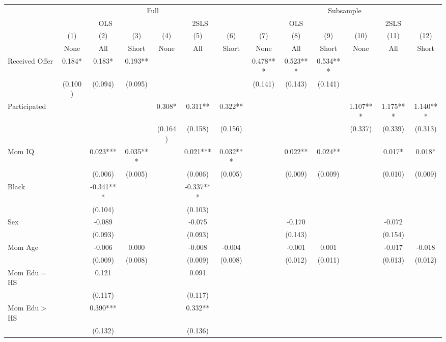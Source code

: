 \begin{tabular}{lcccccccccccc}
\toprule 
\midrule 
 & \multicolumn{6}{c}{Full} & \multicolumn{6}{c}{Subsample} \\
 \cmidrule(lr){2-7} \cmidrule(lr){8-13} 
 & \multicolumn{3}{c}{OLS} & \multicolumn{3}{c}{2SLS} & \multicolumn{3}{c}{OLS} & \multicolumn{3}{c}{2SLS} \\
 \cmidrule(lr){2-4} \cmidrule(lr){5-7} \cmidrule(lr){8-10} \cmidrule(lr){11-13} 
 & (1) & (2) & (3) & (4) & (5) & (6) & (7) & (8) & (9) & (10) & (11) & (12) \\
 & None & All & Short & None & All & Short & None & All & Short & None & All & Short \\
\midrule 
Received Offer & 0.184* & 0.183* & 0.193** &  &  &  & 0.478*** & 0.523*** & 0.534*** &  &  &  \\
 & (0.100) & (0.094) & (0.095) &  &  &  & (0.141) & (0.143) & (0.141) &  &  &  \\
Participated &  &  &  & 0.308* & 0.311** & 0.322** &  &  &  & 1.107*** & 1.175*** & 1.140*** \\
 &  &  &  & (0.164) & (0.158) & (0.156) &  &  &  & (0.337) & (0.339) & (0.313) \\
Mom IQ &  & 0.023*** & 0.035*** &  & 0.021*** & 0.032*** &  & 0.022** & 0.024** &  & 0.017* & 0.018* \\
 &  & (0.006) & (0.005) &  & (0.006) & (0.005) &  & (0.009) & (0.009) &  & (0.010) & (0.009) \\
Black &  & -0.341*** &  &  & -0.337*** &  &  &  &  &  &  &  \\
 &  & (0.104) &  &  & (0.103) &  &  &  &  &  &  &  \\
Sex &  & -0.089 &  &  & -0.075 &  &  & -0.170 &  &  & -0.072 &  \\
 &  & (0.093) &  &  & (0.093) &  &  & (0.143) &  &  & (0.154) &  \\
Mom Age &  & -0.006 & 0.000 &  & -0.008 & -0.004 &  & -0.001 & 0.001 &  & -0.017 & -0.018 \\
 &  & (0.009) & (0.008) &  & (0.009) & (0.008) &  & (0.012) & (0.011) &  & (0.013) & (0.012) \\
Mom Edu$=$HS &  & 0.121 &  &  & 0.091 &  &  &  &  &  &  &  \\
 &  & (0.117) &  &  & (0.117) &  &  &  &  &  &  &  \\
Mom Edu$>$HS &  & 0.390*** &  &  & 0.332** &  &  &  &  &  &  &  \\
 &  & (0.132) &  &  & (0.136) &  &  &  &  &  &  &  \\

\end{tabular}

